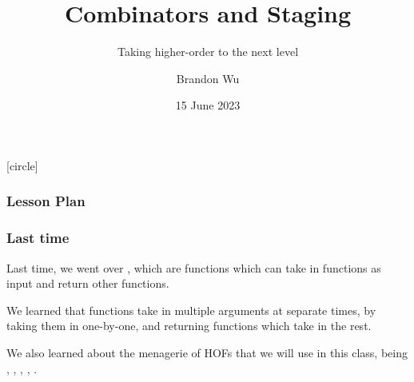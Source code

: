 \documentclass[aspectratio=169, handout]{beamer}
\title{Combinators and Staging} %
\subtitle{Taking higher-order to the next level} %
\date{15 June 2023} %
\author{Brandon Wu} %
\newif\ifcolorlambda
\begin{document}
\ifweb
    \renewcommand{\pause}{}
\fi

[circle]

{
\begin{frame}[plain]
    \colorlambdatrue
    \titlepage
\end{frame}
}


\begin{frame}[fragile]
  \frametitle{Lesson Plan}

  \tableofcontents
\end{frame}


\begin{frame}[fragile]
  \frametitle{Last time}

  Last time, we went over , which are functions which
  can take in functions as input and return other functions.

  \pause
  \vspace{\fill}

  We learned that  functions take in multiple arguments at separate
  times, by taking them in one-by-one, and returning functions which take in the
  rest.

  \pause
  \vspace{\fill}

  We also learned about the menagerie of HOFs that we will use in this class,
  being , , , , .
\end{frame}

\end{document}
